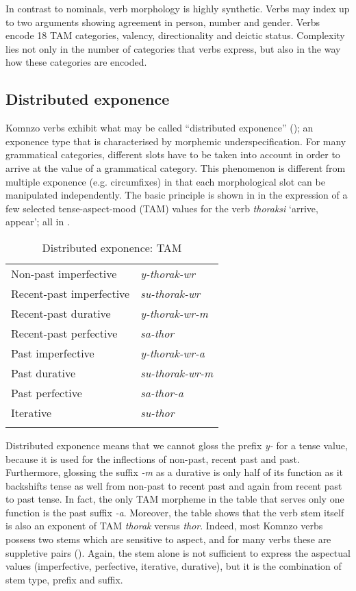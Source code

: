 In contrast to nominals, verb morphology is highly synthetic. Verbs may index up to two arguments showing agreement in person, number and gender. Verbs encode 18 TAM categories, valency, directionality and deictic status. Complexity lies not only in the number of categories that verbs express, but also in the way how these categories are encoded.

\subsection{Distributed exponence}\label{sec:distributedexp}

Komnzo verbs exhibit what may be called ``distributed exponence'' (\cite{Carroll:2016bf}); an exponence type that is characterised by morphemic underspecification. For many grammatical categories, different slots have to be taken into account in order to arrive at the value of a grammatical category. This phenomenon is different from multiple exponence (e.g. circumfixes) in that each morphological slot can be manipulated independently. The basic principle is shown in  in the expression of a few selected tense-aspect-mood (TAM) values for the verb \emph{thoraksi} `arrive, appear'; all in .

\begin{table}
\caption{Distributed exponence: TAM}
\label{tab-01-thoraksi}
\centering
	\begin{tabularx}{.66\textwidth}{Xl}
	\lsptoprule
		Non-past imperfective & \emph{y-thorak-wr}\\
		Recent-past imperfective & \emph{su-thorak-wr}\\
		Recent-past durative & \emph{y-thorak-wr-m}\\
		Recent-past perfective & \emph{sa-thor}\\
		Past imperfective & \emph{y-thorak-wr-a}\\
		Past durative & \emph{su-thorak-wr-m}\\
		Past perfective & \emph{sa-thor-a}\\
		Iterative & \emph{su-thor}\\
	\lspbottomrule
	\end{tabularx}
\end{table}

Distributed exponence means that we cannot gloss the prefix \emph{y-} for a tense value, because it is used for the inflections of non-past, recent past and past. Furthermore, glossing the suffix \emph{-m} as a durative is only half of its function as it backshifts tense as well from non-past to recent past and again from recent past to past tense. In fact, the only TAM morpheme in the table that serves only one function is the past suffix \emph{-a}. Moreover, the table shows that the verb stem itself is also an exponent of TAM \emph{thorak} versus \emph{thor}. Indeed, most Komnzo verbs possess two stems which are sensitive to aspect, and for many verbs these are suppletive pairs (\cite[180ff.]{Dohler:2018qt}). Again, the stem alone is not sufficient to express the aspectual values (imperfective, perfective, iterative, durative), but it is the combination of stem type, prefix and suffix.

